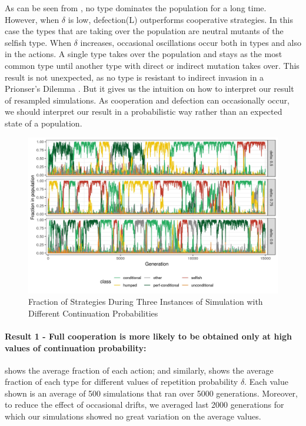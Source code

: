 \documentclass[12pt]{article}
\begin{document}
 As can be seen from , no type dominates the population for a long time. However, when $\delta$ is low, defection(L) outperforms cooperative strategies. In this case the types that are taking over the population are neutral mutants of the selfish type. When $\delta$ increases, occasional oscillations occur both in types and also in the actions. A single type takes over the population and stays as the most common type until another type with direct or indirect mutation takes over.  This result is not unexpected, as no type is resistant to indirect invasion in a Prionser's Dilemma \citep{Van_Veelen2012-xf, Garcia2016-tr, Garcia2018-aj}. But it gives us the intuition on how to interpret our result of resampled simulations. As cooperation and defection can occasionally occur, we should interpret our result in a probabilistic way rather than an expected state of a population.
\begin{figure}[H]
	\centering
	\includegraphics[width=1\linewidth]{img/types_singlerun2}
	\caption[Fraction of Strategies During Three Instances]{Fraction of Strategies During Three Instances of Simulation with Different Continuation Probabilities}
	\label{fig:evo-typessingle}
\end{figure}

\paragraph{Result 1 - Full cooperation is more likely to be obtained only at high values of continuation probability:}

 shows the average fraction of each action; and similarly,  shows the average fraction of each type for different values of repetition probability $\delta$. Each value shown is an average of 500 simulations that ran over 5000 generations. Moreover, to reduce the effect of occasional drifts, we averaged last 2000 generations for which our simulations showed no great variation on the average values.
\end{document}
